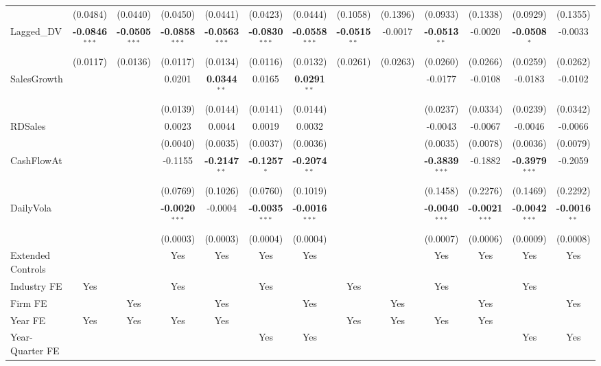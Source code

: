 \begin{landscape}
\begin{table}[H]
\begin{tabular}{lcccccccccccc}
 & (0.0484) & (0.0440) & (0.0450) & (0.0441) & (0.0423) & (0.0444) & (0.1058) & (0.1396) & (0.0933) & (0.1338) & (0.0929) & (0.1355) \\
Lagged\_DV & \textbf{-0.0846}$^{***}$ & \textbf{-0.0505}$^{***}$ & \textbf{-0.0858}$^{***}$ & \textbf{-0.0563}$^{***}$ & \textbf{-0.0830}$^{***}$ & \textbf{-0.0558}$^{***}$ & \textbf{-0.0515}$^{**}$ & -0.0017 & \textbf{-0.0513}$^{**}$ & -0.0020 & \textbf{-0.0508}$^{*}$ & -0.0033 \\
 & (0.0117) & (0.0136) & (0.0117) & (0.0134) & (0.0116) & (0.0132) & (0.0261) & (0.0263) & (0.0260) & (0.0266) & (0.0259) & (0.0262) \\
SalesGrowth &  &  & 0.0201 & \textbf{0.0344}$^{**}$ & 0.0165 & \textbf{0.0291}$^{**}$ &  &  & -0.0177 & -0.0108 & -0.0183 & -0.0102 \\
 &  &  & (0.0139) & (0.0144) & (0.0141) & (0.0144) &  &  & (0.0237) & (0.0334) & (0.0239) & (0.0342) \\
RDSales &  &  & 0.0023 & 0.0044 & 0.0019 & 0.0032 &  &  & -0.0043 & -0.0067 & -0.0046 & -0.0066 \\
 &  &  & (0.0040) & (0.0035) & (0.0037) & (0.0036) &  &  & (0.0035) & (0.0078) & (0.0036) & (0.0079) \\
CashFlowAt &  &  & -0.1155 & \textbf{-0.2147}$^{**}$ & \textbf{-0.1257}$^{*}$ & \textbf{-0.2074}$^{**}$ &  &  & \textbf{-0.3839}$^{***}$ & -0.1882 & \textbf{-0.3979}$^{***}$ & -0.2059 \\
 &  &  & (0.0769) & (0.1026) & (0.0760) & (0.1019) &  &  & (0.1458) & (0.2276) & (0.1469) & (0.2292) \\
DailyVola &  &  & \textbf{-0.0020}$^{***}$ & -0.0004 & \textbf{-0.0035}$^{***}$ & \textbf{-0.0016}$^{***}$ &  &  & \textbf{-0.0040}$^{***}$ & \textbf{-0.0021}$^{***}$ & \textbf{-0.0042}$^{***}$ & \textbf{-0.0016}$^{**}$ \\
 &  &  & (0.0003) & (0.0003) & (0.0004) & (0.0004) &  &  & (0.0007) & (0.0006) & (0.0009) & (0.0008) \\
\midrule
Extended Controls &  &  & Yes & Yes & Yes & Yes &  &  & Yes & Yes & Yes & Yes \\
Industry FE & Yes &  & Yes &  & Yes &  & Yes &  & Yes &  & Yes &  \\
Firm FE &  & Yes &  & Yes &  & Yes &  & Yes &  & Yes &  & Yes \\
Year FE & Yes & Yes & Yes & Yes &  &  & Yes & Yes & Yes & Yes &  &  \\
Year-Quarter FE &  &  &  &  & Yes & Yes &  &  &  &  & Yes & Yes \\

\end{tabular}
\end{table}
\end{landscape}
